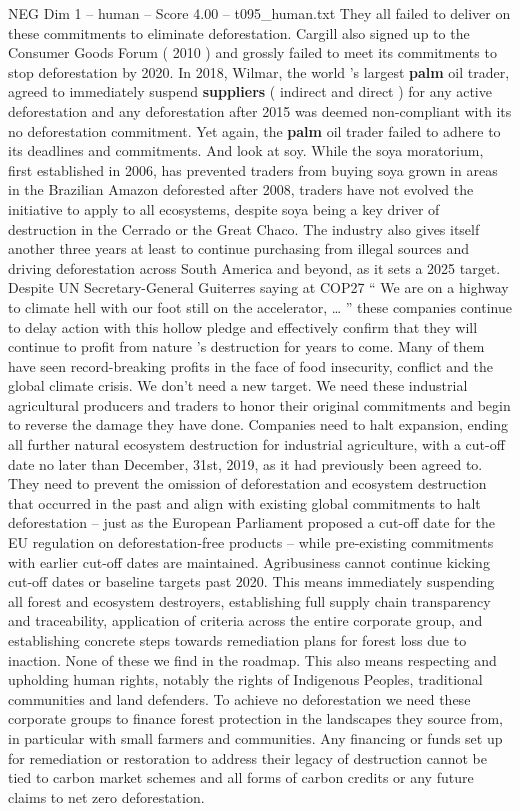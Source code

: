 \begin{textsample}{NEG Dim 1 – human – Score 4.00 – t095\_human.txt}
They all failed to deliver on these commitments to eliminate deforestation.
Cargill also signed up to the Consumer Goods Forum ( 2010 ) and grossly failed to meet its commitments to stop deforestation by 2020.
In 2018, Wilmar, the world ’s largest \textbf{palm} oil trader, agreed to immediately suspend \textbf{suppliers} ( indirect and direct ) for any active deforestation and any deforestation after 2015 was deemed non-compliant with its no deforestation commitment.
Yet again, the \textbf{palm} oil trader failed to adhere to its deadlines and commitments.
And look at soy.
While the soya moratorium, first established in 2006, has prevented traders from buying soya grown in areas in the Brazilian Amazon deforested after 2008, traders have not evolved the initiative to apply to all ecosystems, despite soya being a key driver of destruction in the Cerrado or the Great Chaco.
The industry also gives itself another three years at least to continue purchasing from illegal sources and driving deforestation across South America and beyond, as it sets a 2025 target.
Despite UN Secretary-General Guiterres saying at COP27 “ We are on a highway to climate hell with our foot still on the accelerator, … ” these companies continue to delay action with this hollow pledge and effectively confirm that they will continue to profit from nature ’s destruction for years to come.
Many of them have seen record-breaking profits in the face of food insecurity, conflict and the global climate crisis.
We don't need a new target.
We need these industrial agricultural producers and traders to honor their original commitments and begin to reverse the damage they have done.
Companies need to halt expansion, ending all further natural ecosystem destruction for industrial agriculture, with a cut-off date no later than December, 31st, 2019, as it had previously been agreed to.
They need to prevent the omission of deforestation and ecosystem destruction that occurred in the past and align with existing global commitments to halt deforestation – just as the European Parliament proposed a cut-off date for the EU regulation on deforestation-free products – while pre-existing commitments with earlier cut-off dates are maintained.
Agribusiness cannot continue kicking cut-off dates or baseline targets past 2020.
This means immediately suspending all forest and ecosystem destroyers, establishing full supply chain transparency and traceability, application of criteria across the entire corporate group, and establishing concrete steps towards remediation plans for forest loss due to inaction.
None of these we find in the roadmap.
This also means respecting and upholding human rights, notably the rights of Indigenous Peoples, traditional communities and land defenders.
To achieve no deforestation we need these corporate groups to finance forest protection in the landscapes they source from, in particular with small farmers and communities.
Any financing or funds set up for remediation or restoration to address their legacy of destruction cannot be tied to carbon market schemes and all forms of carbon credits or any future claims to net zero deforestation.

\end{textsample}

